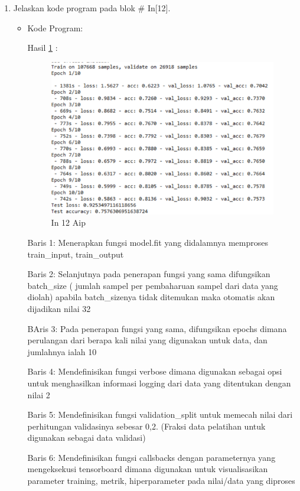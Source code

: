 \begin{enumerate}
\item Jelaskan kode program pada blok \# In[12].
\begin{itemize}
\item Kode Program:

\par Hasil \ref{in12aip} :
\begin{figure}[!hbtp]
\centering
\includegraphics[scale=0.7]{figures/AIP/prak12.PNG}
\caption{In 12 Aip}
\label{in12aip}
\end{figure}
\par Baris 1: Menerapkan fungsi model.fit yang didalamnya memproses train\_input, train\_output
\par Baris 2: Selanjutnya pada penerapan fungsi yang sama difungsikan batch\_size ( jumlah sampel per pembaharuan sampel dari data yang diolah) apabila batch\_sizenya tidak ditemukan maka otomatis akan dijadikan nilai 32	
\par BAris 3: Pada penerapan fungsi yang sama, difungsikan epochs dimana perulangan dari berapa kali nilai yang digunakan untuk data, dan jumlahnya ialah 10
\par Baris 4: Mendefinisikan fungsi verbose dimana digunakan sebagai opsi untuk menghasilkan informasi logging dari data yang ditentukan dengan nilai 2
\par Baris 5: Mendefinisikan fungsi validation\_split untuk memecah nilai dari perhitungan validasinya sebesar 0,2. (Fraksi data pelatihan untuk digunakan sebagai data validasi)
\par Baris 6: Mendefinisikan fungsi callsbacks dengan parameternya yang mengeksekusi tensorboard dimana digunakan untuk visualisasikan parameter training, metrik, hiperparameter pada nilai/data yang diproses

\end{itemize}
\end{enumerate}
